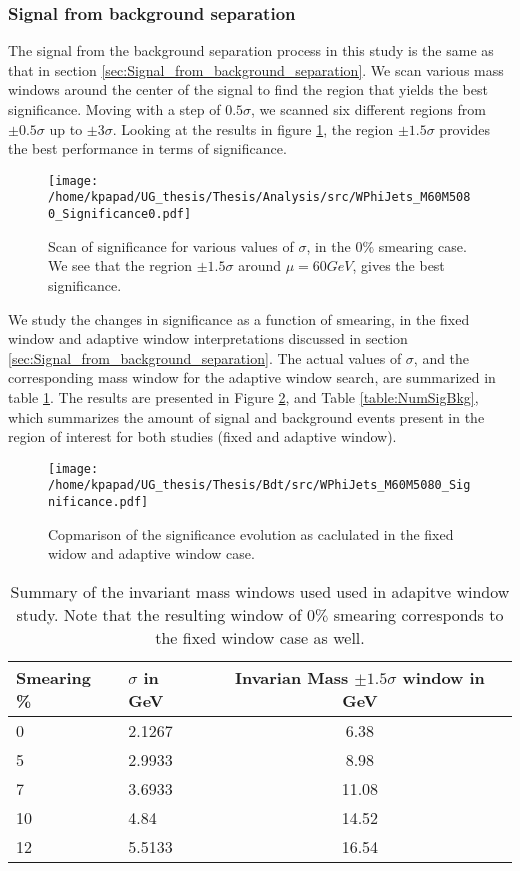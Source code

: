 \subsubsection{Signal from background separation}
\label{sec:org877bc05}
\label{sec:Light_signal_from_background_separation}
The signal from the background separation process in this study is the same as that in section \ref{sec:Signal_from_background_separation}. We scan various mass windows around the center of the signal to find the region that yields the best significance. Moving with a step of \(0.5\sigma\), we scanned six different regions from \(\pm 0.5\sigma\) up to \(\pm 3\sigma\). Looking at the results in figure \ref{fig:LightScan0}, the region \(\pm 1.5\sigma\) provides the best performance in terms of significance.
\begin{figure}[h]
\centering
\texttt{[image: /home/kpapad/UG\_thesis/Thesis/Analysis/src/WPhiJets\_M60M5080\_Significance0.pdf]}
\caption{Scan of significance for various values of $\sigma$, in the $0\%$ smearing case. We see that the regrion $\pm 1.5\sigma$ around $\mu=60GeV$, gives the best significance.}
\label{fig:LightScan0}
\end{figure}

We study the changes in significance as a function of smearing, in the fixed window and adaptive window interpretations discussed in section \ref{sec:Signal_from_background_separation}. The actual values of \(\sigma\), and the corresponding mass window for the adaptive window search, are summarized in table \ref{table:LightAdaSigmas}. The results are presented in Figure \ref{fig:LightAdaFixedSig}, and Table \ref{table:NumSigBkg}, which summarizes the amount of signal and background events present in the region of interest for both studies (fixed and adaptive window).
\begin{figure}[h]
\centering
\texttt{[image: /home/kpapad/UG\_thesis/Thesis/Bdt/src/WPhiJets\_M60M5080\_Significance.pdf]}
\caption{Copmarison of the significance evolution as caclulated in the fixed widow and adaptive window case.} 
\label{fig:LightAdaFixedSig}
\end{figure}

\begin{table}[htbp]
\centering
\begin{tabular}{|p{2cm}|p{2cm}|c|}
 \hline
Smearing \%  & $\sigma$ in GeV & Invarian Mass $\pm 1.5\sigma$ window  in GeV \\
\hline
0 & 2.1267 & 6.38 \\
5 & 2.9933 & 8.98 \\
7 & 3.6933 & 11.08 \\
10 & 4.84 & 14.52 \\
12 & 5.5133 & 16.54 \\
 \hline
\end{tabular}
\caption{Summary of the invariant mass windows used used in adapitve window study. Note that the resulting window of $0\%$ smearing corresponds to the fixed window case as well.}
\label{table:LightAdaSigmas}
\end{table}

